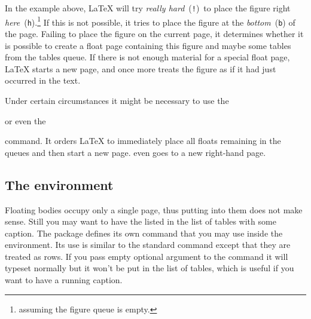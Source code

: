 \noindent In the example above,
\LaTeX{} will try \emph{really hard}~(\texttt{!})\ to place the figure
right \emph{here}~(\texttt{h}).\footnote{assuming the figure queue is
  empty.} If this is not possible, it tries to place the figure at the
\emph{bottom}~(\texttt{b}) of the page.  Failing to place the figure
on the current page, it determines whether it is possible to create a float
page containing this figure and maybe some tables from the tables
queue. If there is not enough material for a special float page,
\LaTeX{} starts a new page, and once more treats the figure as if it
had just occurred in the text.

Under certain circumstances it might be necessary to use the

\begin{lscommand}
 or even the 
\end{lscommand}

\noindent command. It orders \LaTeX{} to immediately place all
floats remaining in the queues and then start a new
page.  even goes to a new right-hand page.

\subsection{The  environment}

Floating bodies occupy only a single page, thus putting  into
them does not make sense. Still you may want to have the  listed
in the list of tables with some caption. The  package defines
its own  command that you may use inside the environment. Its use
is similar to the standard  command except that they are treated as
rows. If you pass empty optional argument to the  command it will
typeset normally but it won't be put in the list of tables, which is useful if
you want to have a running caption.

